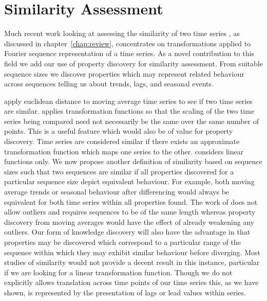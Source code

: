 \section{Similarity Assessment}\label{sec:tr_sim_ass}

Much recent work looking at assessing the similarity of two time
series \cite{alss95,frm94,dgm97,rm97}, as discussed in
chapter~\ref{chap:review}, concentrates on transformations applied to
Fourier sequence representation of a time series.  As a novel
contribution to this field we add our use of property discovery for
similarity assessment. From suitable sequence sizes we
discover properties which may represent related behaviour across
sequences telling us about trends, lags, and seasonal events.

\medskip

\cite{rm97} apply euclidean distance
to moving average time series to see if two time series are similar. 
\cite{dgm97} applies transformation functions so that the scaling of
the two time series being compared need not necessarily be the same
over the same number of points. This is a useful feature which would
also be of value for property discovery. Time series are considered
similar if there exists an approximate transformation function which maps one
series to the other. \cite{dgm97} considers linear functions only. We
now propose another definition of similarity based on sequence sizes
such that two sequences are similar if all properties discovered for a
particular sequence size depict equivalent behaviour. For example,
both moving average trends or seasonal behaviour after differencing
would always be equivalent for both time series within all properties
found. The work of \cite{alss95} does not allow outliers and requires
sequences to be of the same length whereas
property discovery from moving averages would have the effect of
already weakening any outliers. Our form of knowledge discovery will
also have the advantage in that properties may be discovered which
correspond to a particular range of the sequence within which they may
exhibit similar behaviour before diverging.
Most studies of similarity
would not provide a decent result in this instance, particular if we
are looking for a linear transformation function.  Though we do not
explicitly allows translation across time points of our time series
this, as we have shown, is represented by the presentation of lags or
lead values within series. 

\medskip

